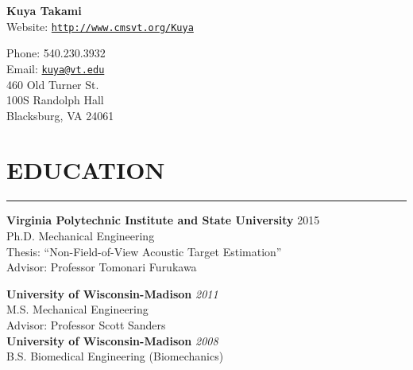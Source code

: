 \documentclass[10pt,letterpaper]{article}
\def\name{\bf Kuya Takami}
\begin{document}

\begin{minipage}{0.7\linewidth}
\vspace{-6mm}
\hspace{5mm}
{\Huge \name}\\

\vspace{2mm}\hspace{7mm}
Website:  \href{http://www.cmsvt.org/Kuya}{\tt http://www.cmsvt.org/Kuya} \\
\end{minipage}
\begin{minipage}{0.6\linewidth} 
      Phone:  540.230.3932\\
	Email:  \href{mailto:kuya@vt.edu}{\tt kuya@vt.edu} \\
    460 Old Turner St.\\
  100S Randolph Hall\\
   Blacksburg, VA 24061\\
\end{minipage}
\vspace{-13mm}
\section*{EDUCATION}
\vspace{-2mm}
\hrule

\begin{center}
\begin{minipage}{0.55\columnwidth}
{\bf Virginia Polytechnic Institute and State University}\hspace{1mm} 2015\\
\hspace{2mm}Ph.D.  Mechanical Engineering  \\ 
\hspace{4mm} Thesis: ``Non-Field-of-View Acoustic Target Estimation''\\
\hspace{28mm} Advisor: Professor Tomonari Furukawa
\end{minipage}
\hfill
\begin{minipage}{0.44\columnwidth}
{\bf University of Wisconsin-Madison} \hfill {\em2011} \\ 
\hspace{5mm} M.S. Mechanical Engineering \\
\hspace{10mm} Advisor: Professor Scott Sanders\\
{\bf University of Wisconsin-Madison} \hfill {\em2008} \\ 
\hspace{5mm}B.S. Biomedical Engineering (Biomechanics)
\end{minipage}
\end{center}
\vspace{-7mm}
\end{document}
